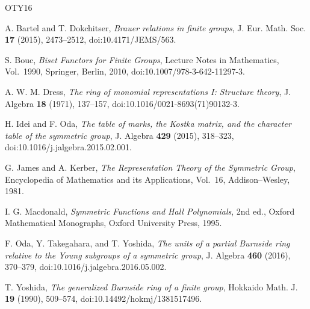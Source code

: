 \documentclass[a4paper,11pt]{article}
\numberwithin{equation}{section}
\begin{document}
\begin{thebibliography}{OTY16}

A. Bartel and T. Dokchitser,
\textit{Brauer relations in finite groups},
J. Eur. Math. Soc. \textbf{17} (2015), 2473--2512,
doi:10.4171/JEMS/563.

S. Bouc,
\textit{Biset Functors for Finite Groups},
Lecture Notes in Mathematics, Vol.~1990, Springer, Berlin, 2010,
doi:10.1007/978-3-642-11297-3.

A. W. M. Dress,
\textit{The ring of monomial representations I: Structure theory},
J. Algebra \textbf{18} (1971), 137--157,
doi:10.1016/0021-8693(71)90132-3.

H. Idei and F. Oda,
\textit{The table of marks, the Kostka matrix, and the character table of the symmetric group},
J. Algebra \textbf{429} (2015), 318--323,\newline
doi:10.1016/j.jalgebra.2015.02.001.

G. James and A. Kerber,
\textit{The Representation Theory of the Symmetric Group},
Encyclopedia of Mathematics and its Applications, Vol.~16,
Addison--Wesley, 1981.

I. G. Macdonald,
\textit{Symmetric Functions and Hall Polynomials}, 2nd ed.,
Oxford Mathematical Monographs, Oxford University Press, 1995.

F. Oda, Y. Takegahara, and T. Yoshida,
\textit{The units of a partial Burnside ring relative to the Young subgroups of a symmetric group},
J. Algebra \textbf{460} (2016), 370--379,\newline
doi:10.1016/j.jalgebra.2016.05.002.

T. Yoshida,
\textit{The generalized Burnside ring of a finite group},
Hokkaido Math. J. \textbf{19} (1990), 509--574,\newline
doi:10.14492/hokmj/1381517496.

\end{thebibliography}
\end{document}
